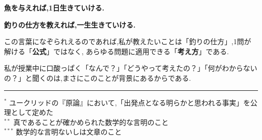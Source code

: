 \begin{center}
  \textbf{魚を与えれば,1日生きていける.}

  \textbf{釣りの仕方を教えれば,一生生きていける.}
\end{center}

この言葉になぞられえるのであれば,私が教えたいことは「釣りの仕方」,1問が解ける「\textbf{公式}」ではなく,
あらゆる問題に適用できる「\textbf{考え方}」である.

私が授業中に口酸っぱく「なんで？」「どうやって考えたの？」「何がわからないの？」と聞くのは,まさにこのことが背景にあるからである.

\vspace{0.35em}
\noindent\rule{\textwidth}{0.4pt}

\vspace{0.2em}
\noindent
$^{*}$ ユークリッドの『原論』において,「出発点となる明らかと思われる事実」を公理として定めた\\
$^{**}$ 真であることが確かめられた数学的な言明のこと\\
$^{***}$ 数学的な言明ないしは文章のこと

\newpage
